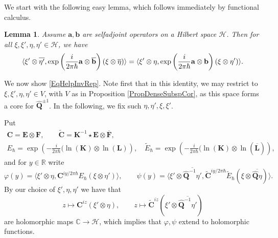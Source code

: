 \documentclass[11pt, reqno]{amsart}
\newtheorem{lemma}[theorem]{Lemma}
\theoremstyle{definition}
\numberwithin{equation}{section}
\def\C{\mathbb C}
\def\Hc{\mathcal H}
\def\R{\mathbb R}
\newcommand{\Hsp}{\mathcal{H}}
\newcommand{\Qb}{\mathbf{Q}}
\newcommand{\Eb}{\mathbf{E}}
\newcommand{\Fb}{\mathbf{F}}
\newcommand{\Kb}{\mathbf{K}}
\newcommand{\Lb}{\mathbf{L}}
\newcommand{\Cb}{\mathbf{C}}
\begin{document}
We start with the following easy lemma, which follows immediately by functional calculus.

\begin{lemma}
Assume $\mathbf{a},\mathbf{b}$ are selfadjoint operators on a Hilbert space $\Hc$. Then for all $\xi,\xi',\eta,\eta'\in \Hc$, we have
\begin{equation}\label{EqAntiSwitch}
\langle \xi'\otimes  \overline{\eta'}, \exp\left(\frac{i}{2\pi\hbar}\mathbf{a}\otimes \overline{\mathbf{b}}\right)(\xi\otimes \overline{\eta})\rangle \\
= \langle \xi'\otimes \eta, \exp\left(\frac{i}{2\pi \hbar}\mathbf{a}\otimes \mathbf{b}\right)(\xi\otimes \eta')\rangle.
\end{equation}
\end{lemma}

We now show \eqref{EqHelpInvRep}.
Note first that in this identity, we may restrict to $\xi,\xi',\eta,\eta' \in V$, 
with $V$ as in Proposition \ref{PropDenseSubspCor}, as this space forms a core for $\hat{\Qb}^{\pm 1}$. In the following, we fix such $\eta,\eta',\xi,\xi'$. 

Put 
\begin{multline*}
\Cb = \Eb\otimes \Fb,\qquad \widetilde{\Cb}= \Kb^{-1}\star\Eb\otimes \overline{\Fb},\\
E_{\hbar} = \exp\left(-\frac{i}{2\pi \hbar}(\ln(\Kb)\otimes \ln(\Lb)\right),\quad \widetilde{E}_{\hbar} = \exp\left(-\frac{i}{2\pi \hbar}(\ln(\Kb)\otimes \ln(\overline{\Lb})\right), 
\end{multline*}
and for $y \in \R$ write 
\[
\varphi(y) = \langle \xi' \otimes \eta,\Cb^{iy/2\pi \hbar}E_{\hbar}(\xi\otimes \eta')\rangle,\qquad 
\psi(y) = \langle \xi'\otimes \overline{\hat{\Qb}^{-1}\eta'},\widetilde{\Cb}^{iy/2\pi\hbar}\widetilde{E}_{\hbar}(\xi\otimes \overline{\hat{\Qb}\eta})\rangle.
\]
By our choice of $\xi',\eta,\eta'$ we have that 
\[
z \mapsto \Cb^{iz} (\xi'\otimes \eta),\qquad z \mapsto \widetilde{\Cb}^{iz}(\xi'\otimes \overline{\hat{\Qb}^{-1}\eta'}) 
\]
are holomorphic maps $\C\rightarrow \Hsp$, which implies that $\varphi,\psi$ extend to holomorphic functions.
\end{document}
